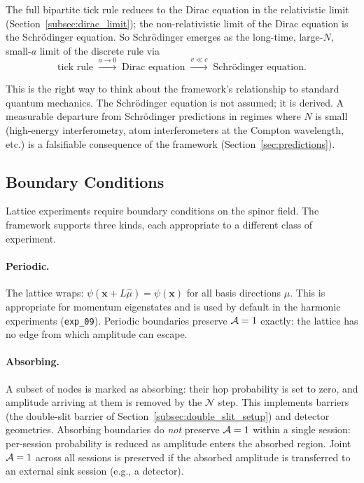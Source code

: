 The full bipartite tick rule reduces to the Dirac equation in the
relativistic limit (Section~\ref{subsec:dirac_limit}); the
non-relativistic limit of the Dirac equation is the Schr\"odinger
equation. So Schr\"odinger emerges as the long-time, large-$N$,
small-$a$ limit of the discrete rule via
\begin{equation*}
    \text{tick rule}
    \;\xrightarrow{a \to 0}\;
    \text{Dirac equation}
    \;\xrightarrow{v \ll c}\;
    \text{Schr\"odinger equation}.
\end{equation*}

This is the right way to think about the framework's relationship to
standard quantum mechanics. The Schr\"odinger equation is not
assumed; it is derived. A measurable departure from
Schr\"odinger predictions in regimes where $N$ is small (high-energy
interferometry, atom interferometers at the Compton wavelength, etc.)
is a falsifiable consequence of the framework
(Section~\ref{sec:predictions}).

\subsection{Boundary Conditions}
\label{subsec:boundary_conditions}

Lattice experiments require boundary conditions on the spinor field.
The framework supports three kinds, each appropriate to a different
class of experiment.

\paragraph{Periodic.}
The lattice wraps:
$\psi(\mathbf{x} + L\hat{\mu}) = \psi(\mathbf{x})$ for all basis
directions $\hat{\mu}$. This is appropriate for momentum eigenstates
and is used by default in the harmonic experiments
(\texttt{exp\_09}). Periodic boundaries preserve $\mathcal{A}=1$ exactly:
the lattice has no edge from which amplitude can escape.

\paragraph{Absorbing.}
A subset of nodes is marked as absorbing: their hop probability is
set to zero, and amplitude arriving at them is removed by the
$\mathcal{N}$ step. This implements barriers (the double-slit
barrier of Section~\ref{subsec:double_slit_setup}) and detector
geometries. Absorbing boundaries do \emph{not} preserve $\mathcal{A}=1$
within a single session: per-session probability is reduced as
amplitude enters the absorbed region. Joint $\mathcal{A}=1$ across all
sessions is preserved if the absorbed amplitude is transferred to an
external sink session (e.g., a detector).

